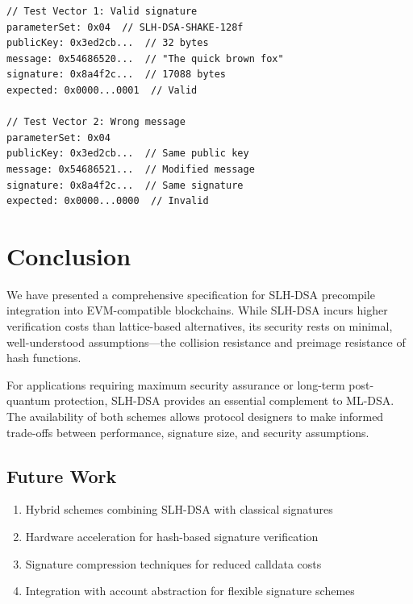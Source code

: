 \documentclass[11pt,a4paper]{article}
\begin{document}
\begin{lstlisting}[caption={SLH-DSA-SHAKE-128f Test Vector (truncated)}]
// Test Vector 1: Valid signature
parameterSet: 0x04  // SLH-DSA-SHAKE-128f
publicKey: 0x3ed2cb...  // 32 bytes
message: 0x54686520...  // "The quick brown fox"
signature: 0x8a4f2c...  // 17088 bytes
expected: 0x0000...0001  // Valid

// Test Vector 2: Wrong message
parameterSet: 0x04
publicKey: 0x3ed2cb...  // Same public key
message: 0x54686521...  // Modified message
signature: 0x8a4f2c...  // Same signature
expected: 0x0000...0000  // Invalid
\end{lstlisting}

\section{Conclusion}

We have presented a comprehensive specification for SLH-DSA precompile integration into EVM-compatible blockchains. While SLH-DSA incurs higher verification costs than lattice-based alternatives, its security rests on minimal, well-understood assumptions---the collision resistance and preimage resistance of hash functions.

For applications requiring maximum security assurance or long-term post-quantum protection, SLH-DSA provides an essential complement to ML-DSA. The availability of both schemes allows protocol designers to make informed trade-offs between performance, signature size, and security assumptions.

\subsection{Future Work}

\begin{enumerate}
    \item Hybrid schemes combining SLH-DSA with classical signatures
    \item Hardware acceleration for hash-based signature verification
    \item Signature compression techniques for reduced calldata costs
    \item Integration with account abstraction for flexible signature schemes
\end{enumerate}
\end{document}
